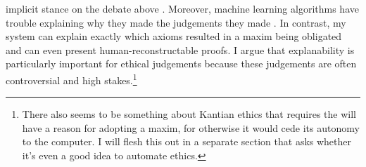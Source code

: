 \begin{isabellebody}
\begin{isamarkuptext}
implicit stance on the debate above \cite{delphi}. Moreover, machine learning algorithms have trouble
explaining why they made the judgements they made \cite{puiutta}. In contrast, my system can explain 
exactly which axioms resulted in a maxim being obligated and can even present human-reconstructable proofs.
I argue that explanability is particularly important for ethical judgements because these judgements 
are often controversial and high stakes.\footnote{There also seems to be something about Kantian ethics
that requires the will have a reason for adopting a maxim, for otherwise it would cede its autonomy
to the computer. I will flesh this out in a separate section that asks whether it's even a good idea 
to automate ethics.}%
\end{isamarkuptext}\isamarkuptrue%
%
\isadelimtheory
%
\endisadelimtheory
%
\isatagtheory
%
\endisatagtheory
{\isafoldtheory}%
%
\isadelimtheory
%
\endisadelimtheory
%
\end{isabellebody}%
\endinput
